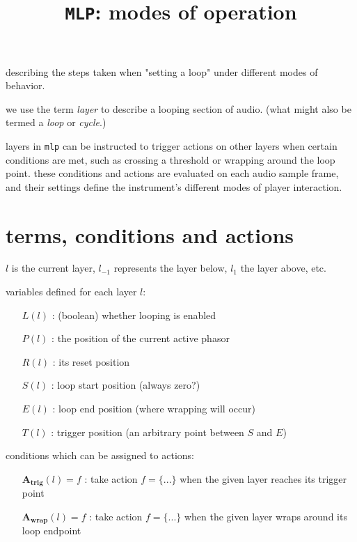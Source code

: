 \documentclass{article}
\begin{document}
\title{\texttt{MLP}: modes of operation}

\maketitle

describing the steps taken when "setting a loop" under different modes of behavior.

we use the term \textit{layer} to describe a looping section of audio. (what might also be termed a \textit{loop} or \textit{cycle}.)

layers in \texttt{mlp} can be instructed to trigger actions on other layers when certain conditions are met, such as crossing a threshold or wrapping around the loop point. these conditions and actions are evaluated on each audio sample frame, and their settings define the instrument's different modes of player interaction.

\section[terms]{terms, conditions and actions}

$l$ is the current layer, $l_{-1}$ represents the layer below, $l_{1}$ the layer above, etc.

variables defined for each layer $l$:

\begin{itemize}%
\item[$L(l)$]: (boolean) whether looping is enabled 
\item[$P(l)$]: the position of the current active phasor
\item[$R(l)$]: its reset position
\item[$S(l)$]: loop start position (always zero?)
\item[$E(l)$]: loop end position (where wrapping will occur)
\item[$T(l)$]: trigger position (an arbitrary point between $S$ and $E$)
\end{itemize}

conditions which can be assigned to actions:

\begin{itemize}%
\item[$\mathbf{A_{trig}}(l) = f$]: take action $f = \{...\}$ when the given layer reaches its trigger point
\item[$\mathbf{A_{wrap}}(l) = f$]: take action $f = \{...\}$ when the given layer wraps around its loop endpoint
\end{itemize}
\end{document}
